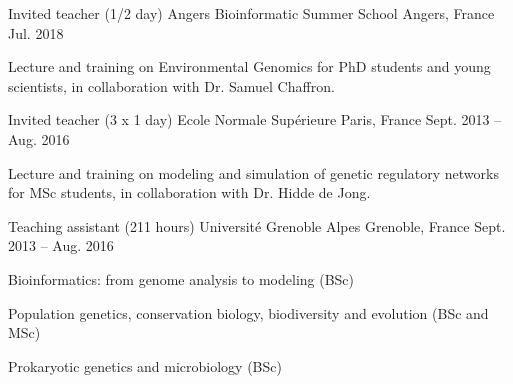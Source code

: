 
\begin{cventries}
  \cventry
    {Invited teacher (1/2 day)} %
    {Angers Bioinformatic Summer School} %
    {Angers, France} %
    {Jul. 2018} %
    {
	\begin{cvitems} %
		\item {Lecture and training on Environmental Genomics for PhD students and young scientists, in collaboration with Dr. Samuel Chaffron.}
	\end{cvitems}
    }
    
  \cventry
    {Invited teacher (3 x 1 day)} %
    {Ecole Normale Supérieure} %
    {Paris, France} %
    {Sept. 2013 -- Aug. 2016} %
    {
	\begin{cvitems} %
		\item {Lecture and training on modeling and simulation of genetic regulatory networks for MSc students, in collaboration with Dr. Hidde de Jong.}
	\end{cvitems}
    }
    
  \cventry
    {Teaching assistant (211 hours)} %
    {Université Grenoble Alpes} %
    {Grenoble, France} %
    {Sept. 2013 -- Aug. 2016} %
    {
	\begin{cvitems} %
		\item {Bioinformatics: from genome analysis to modeling (BSc)}
		\item {Population genetics, conservation biology, biodiversity and evolution (BSc and MSc)}
		\item {Prokaryotic genetics and microbiology (BSc)}
	\end{cvitems}
    }

\end{cventries}